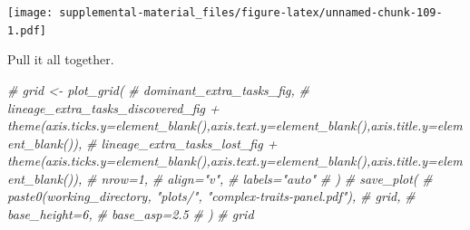 \documentclass[]{book}
\newenvironment{Shaded}{\begin{snugshade}}{\end{snugshade}}
\newcommand{\CommentTok}[1]{\textcolor[rgb]{0.56,0.35,0.01}{\textit{#1}}}
\begin{document}
\texttt{[image: supplemental-material\_files/figure-latex/unnamed-chunk-109-1.pdf]}

Pull it all together.

\begin{Shaded}
\begin{Highlighting}[]
\CommentTok{# grid <- plot_grid(}
\CommentTok{#   dominant_extra_tasks_fig,}
\CommentTok{#   lineage_extra_tasks_discovered_fig + theme(axis.ticks.y=element_blank(),axis.text.y=element_blank(),axis.title.y=element_blank()),}
\CommentTok{#   lineage_extra_tasks_lost_fig + theme(axis.ticks.y=element_blank(),axis.text.y=element_blank(),axis.title.y=element_blank()),}
\CommentTok{#   nrow=1,}
\CommentTok{#   align="v",}
\CommentTok{#   labels="auto"}
\CommentTok{# )}
\CommentTok{# save_plot(}
\CommentTok{#    paste0(working_directory, "plots/", "complex-traits-panel.pdf"),}
\CommentTok{#    grid,}
\CommentTok{#    base_height=6,}
\CommentTok{#    base_asp=2.5}
\CommentTok{# )}
\CommentTok{# grid}
\end{Highlighting}
\end{Shaded}


\end{document}
